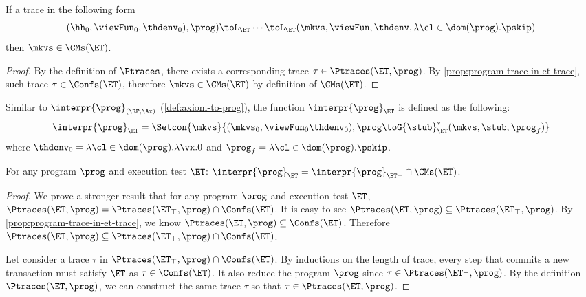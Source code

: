 \begin{corollary}
If a trace in the following form
\[
    (\hh_{0}, \viewFun_{0}, \thdenv_{0}), \prog) \toL_{\ET} \cdots \toL_{\ET} 
    (\mkvs, \viewFun, \thdenv, \lambda \cl \in \dom(\prog). \pskip)
\]
then $\mkvs \in \CMs(\ET)$.
\end{corollary}
\begin{proof}
    By the definition of \( \Ptraces \), 
    there exists a corresponding trace \( \tau \in \Ptraces(\ET, \prog) \).
    By \cref{prop:program-trace-in-et-trace}, such trace \( \tau \in \Confs(\ET) \),
    therefore \( \mkvs \in \CMs(\ET)\) by definition of \( \CMs(\ET) \).
\end{proof}

Similar to \( \interpr{\prog}_{(\RP,\Ax)} \) (\cref{def:axiom-to-prog}), the function \( \interpr{\prog}_{\ET} \) is defined as the following:
\[
    \interpr{\prog}_{\ET} = \Setcon{ \mkvs }{ (\mkvs_{0}, \viewFun_0 \thdenv_{0} ), \prog \toG{\stub}_{\ET}^{\ast} (\mkvs, \stub, \prog_{f}) }
\]
where $\thdenv_{0} = \lambda \cl \in \dom(\prog).\lambda \vx.0$ and $\prog_{f} = \lambda \cl \in \dom(\prog).\pskip$.

\begin{proposition}
    \label{thm:consistency-intersect-permissive}
    For any program $\prog$ and execution test $\ET$:
    \( \interpr{\prog}_{\ET} = \interpr{\prog}_{\ET_\top}  \cap \CMs(\ET) \).
\end{proposition}
\begin{proof}
    We prove a stronger result that for any program $\prog$ and execution test $\ET$, $\Ptraces(\ET, \prog) = \Ptraces(\ET_{\top}, \prog) \cap \Confs(\ET)$.
    It is easy to see \(\Ptraces(\ET, \prog) \subseteq \Ptraces(\ET_\top, \prog) \).
    By \cref{prop:program-trace-in-et-trace}, we know \( \Ptraces(\ET, \prog) \subseteq \Confs(\ET)\).
    Therefore \(  \Ptraces(\ET, \prog) \subseteq \Ptraces(\ET_\top, \prog) \cap \Confs(\ET) \).

    Let consider a trace \( \tau \) in \( \Ptraces(\ET_\top, \prog) \cap \Confs(\ET) \).
    By inductions on the length of trace, 
    every step that commits a new transaction  must satisfy \( \ET \) as \( \tau \in \Confs(\ET) \).
    It also reduce the program \( \prog \) since \( \tau \in \Ptraces(\ET_\top, \prog) \).
    By the definition \( \Ptraces(\ET, \prog) \), we can construct the same trace \( \tau \) so that \( \tau \in \Ptraces(\ET, \prog) \).
\end{proof}
